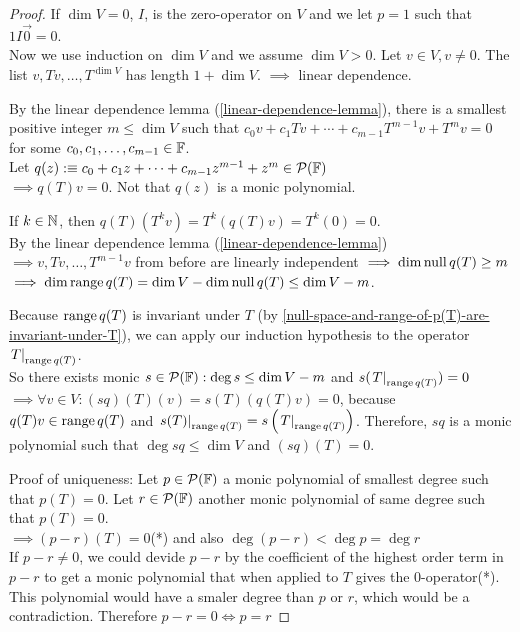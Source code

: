 \begin{proof}
    If $\dim V=0$, $I$, is the zero-operator on $V$ and we let $p=1$ such that $1I\vec0=0$. \\
    Now we use induction on $\dim V$ and we assume $\dim V > 0$. Let $v\in V, v \neq 0$. The list $v, Tv, \dots, T^{\dim V}$ has length $1+\dim V.$
    $\implies$ linear dependence.
    
    By the linear dependence lemma (\ref{linear-dependence-lemma}), there is a smallest positive integer $m\leq \dim V$ such that $c_0 v + c_1 Tv + \cdots + c_{m-1} T^{m-1} v + T^m v = 0$ for some $c_0, c_1, \dots, c_{m-1} \in \mathbb{F}$. \\
    
    Let $q(z) :\equiv c_0 + c_1z + \cdots + c_{m-1} z^{m-1} +z^{m} \in \mathcal{P} (\mathbb{F})$ \\
    $\implies q(T) v=0$. Not that $q(z)$ is a monic polynomial.
    
    If $k \in \mathbb{N}$, then $q(T)(T^kv)=T^k(q(T)v) =T^k (0) =0$.\\
    By the linear dependence lemma (\ref{linear-dependence-lemma}) $\implies v, Tv, \dots, T^{m-1}v$ from before are linearly independent $\implies \dim \operatorname{null} q(T) \geq m$ \\
    $\implies \dim \operatorname{range} q(T) = \dim V - \dim \operatorname{null} q(T) \leq \dim V - m$.
    
    Because $\operatorname{range} q(T)$ is invariant under $T$ (by \ref{null-space-and-range-of-p(T)-are-invariant-under-T}), we can apply our induction hypothesis to the operator $\left.T\right|_{\operatorname{range} q(T)}$. \\
    So there exists monic $s \in \mathcal{P} (\mathbb{F}): \deg s \leq \dim V - m$ and $s(\left.T\right|_{\operatorname{range} q(T)})=0$ \\
    $\implies \forall v \in V: (sq)(T)(v) = s(T) (q(T)v) = 0$, because $q(T)v \in \operatorname{range} q(T)$ and $\left.s(T)\right|_{\operatorname{range} q(T)}=s\left( \left.T\right|_{\operatorname{range} q(T)} \right )$.
    Therefore, $sq$ is a monic polynomial such that $\deg sq \leq \dim V$ and $(sq)(T)=0$.
    
    Proof of uniqueness: Let $p\in \mathcal{P} (\mathbb{F})$ a monic polynomial of smallest degree such that $p(T)=0$. Let $r\in \mathcal{P} ( \mathbb{F})$ another monic polynomial of same degree such that $p(T)=0$. \\
    $\implies (p-r) (T) = 0$(*) and also $\deg (p-r) < \deg p = \deg r$ \\
    If $p-r \neq 0$, we could devide $p-r$ by the coefficient of the highest order term in $p-r$ to get a monic polynomial that when applied to $T$ gives the $0$-operator(*). This polynomial would have a smaler degree than $p$ or $r$, which would be a contradiction. Therefore $p-r=0 \iff p = r$
\end{proof}

